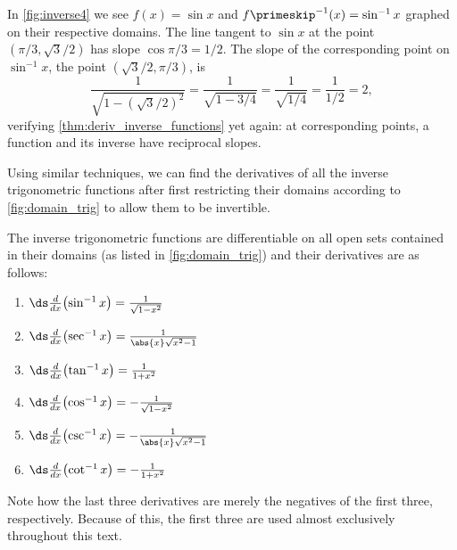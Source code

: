 In \autoref{fig:inverse4} we see $f(x) = \sin x$ and $f\primeskip^{-1}(x)=\sin^{-1} x$ graphed on their respective domains. The line tangent to $\sin x$ at the point $(\pi/3, \sqrt{3}/2)$ has slope $\cos \pi/3 = 1/2$. The slope of the corresponding point on $\sin^{-1}x$, the point $(\sqrt{3}/2,\pi/3)$, is
\[\frac{1}{\sqrt{1-(\sqrt{3}/2)^2}} = \frac{1}{\sqrt{1-3/4}} = \frac{1}{\sqrt{1/4}} = \frac{1}{1/2}=2,\]
verifying \autoref{thm:deriv_inverse_functions} yet again: at corresponding points, a function and its inverse have reciprocal slopes.\bigskip

Using similar techniques, we can find the derivatives of all the inverse trigonometric functions after first restricting their domains according to \autoref{fig:domain_trig} to allow them to be invertible.

{
\begin{theorem}\label{thm:deriv_inverse_trig}
The inverse trigonometric functions are differentiable on all open sets contained in their domains (as listed in \autoref{fig:domain_trig}) and their derivatives are as follows:
\begin{multicols}{2}
	\begin{enumerate}
		\item	$\ds\frac d{dx}\bigl(\sin^{-1}x\bigr)= \frac1{\sqrt{1-x^2}}$ 
		\item	$\ds\frac d{dx}\bigl(\sec^{-1}x\bigr)= \frac1{\abs{x}\sqrt{x^2-1}}$
		\item	$\ds\frac d{dx}\bigl(\tan^{-1}x\bigr)= \frac1{1+x^2}$
		\item	$\ds\frac d{dx}\bigl(\cos^{-1}x\bigr)=-\frac1{\sqrt{1-x^2}}$ 
		\item	$\ds\frac d{dx}\bigl(\csc^{-1}x\bigr)=-\frac1{\abs{x}\sqrt{x^2-1}}$
		\item	$\ds\frac d{dx}\bigl(\cot^{-1}x\bigr)=-\frac1{1+x^2}$
	\end{enumerate}
\end{multicols}
\end{theorem}}

Note how the last three derivatives are merely the negatives of the first three, respectively. Because of this, the first three are used almost exclusively throughout this text.

